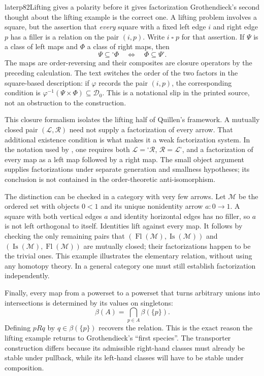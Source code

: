 \begin{dcomment}{later}{p82}{Lifting gives a polarity before it gives factorization}
Grothendieck's second thought about the lifting example is the correct one. A lifting problem involves a square, but the assertion that \emph{every} square with a fixed left edge $i$ and right edge $p$ has a filler is a relation on the pair $(i,p)$. Write $i\mathbin{\square}p$ for that assertion. If $\Psi$ is a class of left maps and $\Phi$ a class of right maps, then
\[
 \Psi\subseteq{}^\square\Phi
 \quad\Longleftrightarrow\quad
 \Phi\subseteq\Psi^\square.
\]
The maps are order-reversing and their composites are closure operators by the preceding calculation. The text switches the order of the two factors in the square-based description: if $\varphi$ records the pair $(i,p)$, the corresponding condition is $\varphi^{-1}(\Psi\times\Phi)\subseteq\mathcal D_0$. This is a notational slip in the printed source, not an obstruction to the construction.

This closure formalism isolates the lifting half of Quillen's framework. A mutually closed pair $(\mathcal L,\mathcal R)$ need not supply a factorization of every arrow. That additional existence condition is what makes it a weak factorization system. In the notation used by \citet[Definition 11.2.1]{Riehl2014}, one requires both $\mathcal L={}^\square\mathcal R$, $\mathcal R=\mathcal L^\square$, and a factorization of every map as a left map followed by a right map. The small object argument supplies factorizations under separate generation and smallness hypotheses; its conclusion is not contained in the order-theoretic anti-isomorphism.

The distinction can be checked in a category with very few arrows. Let $\mathcal M$ be the ordered set with objects $0<1$ and its unique nonidentity arrow $a:0\to1$. A square with both vertical edges $a$ and identity horizontal edges has no filler, so $a$ is not left orthogonal to itself. Identities lift against every map. It follows by checking the only remaining pairs that $({}\!\operatorname{Fl}(\mathcal M),\operatorname{Is}(\mathcal M))$ and $(\operatorname{Is}(\mathcal M),\operatorname{Fl}(\mathcal M))$ are mutually closed; their factorizations happen to be the trivial ones. This example illustrates the elementary relation, without using any homotopy theory. In a general category one must still establish factorization independently.

Finally, every map from a powerset to a powerset that turns arbitrary unions into intersections is determined by its values on singletons:
\[
 \beta(A)=\bigcap_{p\in A}\beta(\{p\}).
\]
Defining $pRq$ by $q\in\beta(\{p\})$ recovers the relation. This is the exact reason the lifting example returns to Grothendieck's ``first species''. The transporter construction differs because its admissible right-hand classes must already be stable under pullback, while its left-hand classes will have to be stable under composition.
\end{dcomment}

